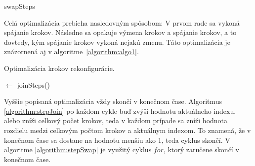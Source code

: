 \documentclass[
  printed, %
  oneside, %
  notable,   %
  nolof,     %
  nolot,     %
]{fithesis3}
\begin{document}
\begin{algorithm}
    \caption{swapSteps}
    \label{algorithm:stepSwap}
    
    \DontPrintSemicolon
    
\end{algorithm}

Celá optimalizácia prebieha nasledovným spôsobom: V prvom rade sa vykoná spájanie krokov. Následne sa opakuje výmena krokov a spájanie krokov, a to dovtedy, kým spájanie krokov vykoná nejakú zmenu. Táto optimalizácia je znázornená aj v algoritme~\ref{algorithm:algo1}. 

\begin{algorithm}
    \caption{Optimalizácia krokov rekonfigurácie. }
    \label{algorithm:algo1}
    
    \DontPrintSemicolon
    
    \Steps $\leftarrow$ joinSteps(\Steps)\;
\end{algorithm}

Vyššie popísaná optimalizácia vždy skončí v konečnom čase. Algoritmus \ref{algorithm:stepJoin} po každom cykle buď zvýši hodnotu aktuálneho indexu, alebo zníži celkový počet krokov, teda v každom prípade sa zníži hodnota rozdielu medzi celkovým počtom krokov a aktuálnym indexom. To znamená, že v konečnom čase sa dostane na hodnotu menšiu ako $1$, teda cyklus skončí. V algoritme \ref{algorithm:stepSwap} je využitý cyklus $for$, ktorý zaručene skončí v konečnom čase. 
\end{document}
